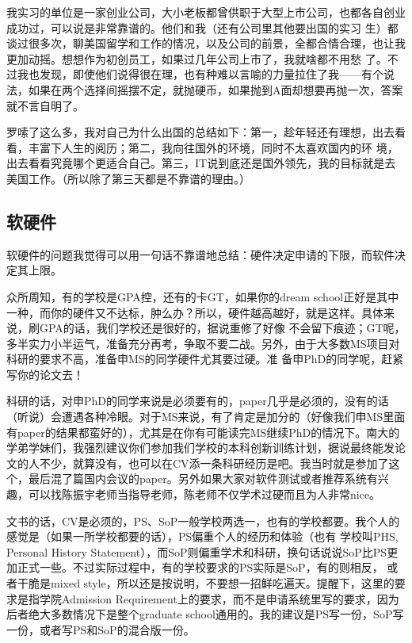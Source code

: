 我实习的单位是一家创业公司，大小老板都曾供职于大型上市公司，也都各自创业成功过，可以说是非常靠谱的。他们和我（还有公司里其他要出国的实习 生）都谈过很多次，聊美国留学和工作的情况，以及公司的前景，全都合情合理，也让我更加动摇。想想作为初创员工，如果过几年公司上市了，我就啥都不用愁 了。不过我也发现，即使他们说得很在理，也有种难以言喻的力量拉住了我——有个说法，如果在两个选择间摇摆不定，就抛硬币，如果抛到A面却想要再抛一次，答案就不言自明了。\par

罗嗦了这么多，我对自己为什么出国的总结如下：第一，趁年轻还有理想，出去看看，丰富下人生的阅历；第二，我向往国外的环境，同时不太喜欢国内的环 境，出去看看究竟哪个更适合自己。第三，IT说到底还是国外领先，我的目标就是去美国工作。（所以除了第三天都是不靠谱的理由。）\par

\subsection{软硬件}

软硬件的问题我觉得可以用一句话不靠谱地总结：硬件决定申请的下限，而软件决定其上限。\par

众所周知，有的学校是GPA控，还有的卡GT，如果你的dream school正好是其中一种，而你的硬件又不达标，肿么办？所以，硬件越高越好，就是这样。具体来说，刷GPA的话，我们学校还是很好的，据说重修了好像 不会留下痕迹；GT呢，多半实力小半运气，准备充分再考，争取不要二战。另外，由于大多数MS项目对科研的要求不高，准备申MS的同学硬件尤其要过硬。准 备申PhD的同学呢，赶紧写你的论文去！\par

科研的话，对申PhD的同学来说是必须要有的，paper几乎是必须的，没有的话（听说）会遭遇各种冷眼。对于MS来说，有了肯定是加分的（好像我们申MS里面有paper的结果都蛮好的），尤其是在你有可能读完MS继续PhD的情况下。南大的学弟学妹们，我强烈建议你们参加我们学校的本科创新训练计划，据说最终能发论文的人不少，就算没有，也可以在CV添一条科研经历是吧。我当时就是参加了这个，最后混了篇国内会议的paper。另外如果大家对软件测试或者推荐系统有兴趣，可以找陈振宇老师当指导老师，陈老师不仅学术过硬而且为人非常nice。\par

文书的话，CV是必须的，PS、SoP一般学校两选一，也有的学校都要。我个人的感觉是（如果一所学校都要的话），PS偏重个人的经历和体验（也有 学校叫PHS, Personal History Statement），而SoP则偏重学术和科研，换句话说说SoP比PS更加正式一些。不过实际过程中，有的学校要求的PS实际是SoP，有的则相反， 或者干脆是mixed style，所以还是按说明，不要想一招鲜吃遍天。提醒下，这里的要求是指学院Admission Requirement上的要求，而不是申请系统里写的要求，因为后者绝大多数情况下是整个graduate school通用的。我的建议是PS写一份，SoP写一份，或者写PS和SoP的混合版一份。\par

